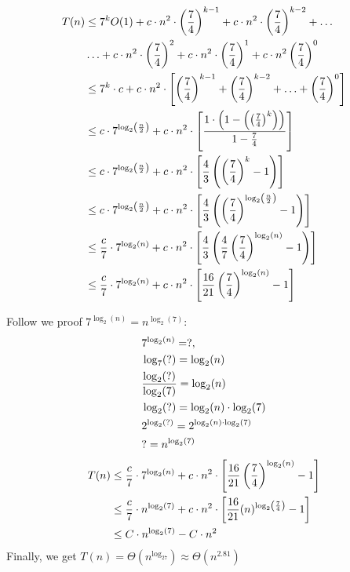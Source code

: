 \documentclass[journal]{IEEEtran}
\begin{document}
\begin{align}
  \notag
  T(n) & \leq 7^{k} O(1)+c \cdot n^{2} \cdot\left(\frac{7}{4}\right)^{k-1}+c \cdot n^{2} \cdot\left(\frac{7}{4}\right)^{k-2}+\ldots\\ \notag
   &\ldots+c \cdot n^{2} \cdot\left(\frac{7}{4}\right)^{2}+c \cdot n^{2} \cdot\left(\frac{7}{4}\right)^{1}+c \cdot n^{2}\left(\frac{7}{4}\right)^{0} \\ \notag
& \leq 7^{k} \cdot c+c \cdot n^{2} \cdot\left[\left(\frac{7}{4}\right)^{k-1}+\left(\frac{7}{4}\right)^{k-2}+\ldots +\left(\frac{7}{4}\right)^{0}\right]\\ \notag
&\leq c \cdot 7^{\log _{2}\left(\frac{n}{2}\right)}+c \cdot n^{2} \cdot\left[\frac{1 \cdot\left(1-\left(\left(\frac{7}{4}\right)^{k}\right)\right)}{1-\frac{7}{4}}\right] \\ \notag
&\leq c \cdot 7^{\log _{2}\left(\frac{n}{2}\right)}+c \cdot n^{2} \cdot\left[\frac{4}{3}\left(\left(\frac{7}{4}\right)^{k}-1\right)\right] \\ \notag
&\leq c \cdot 7^{\log _{2}\left(\frac{n}{2}\right)}+c \cdot n^{2} \cdot\left[\frac{4}{3}\left(\left(\frac{7}{4}\right)^{\log _{2}\left(\frac{n}{2}\right)}-1\right)\right] \\ \notag
&\leq \frac{c}{7} \cdot 7^{\log _{2}(n)}+c \cdot n^{2} \cdot\left[\frac{4}{3}\left(\frac{4}{7}\left(\frac{7}{4}\right)^{\log _{2}(n)}-1\right)\right] \\ \notag
&\leq \frac{c}{7} \cdot 7^{\log _{2}(n)}+c \cdot n^{2} \cdot\left[\frac{16}{21}\left(\frac{7}{4}\right)^{\log _{2}(n)}-1\right]
\end{align}


Follow we proof $7^{\log _{2}(n)}=n^{\log _{2}(7)}:$
\begin{align}
  \notag
 &7^{\log _{2}(n)}=?,\\\notag
 &\log _{7}(?)=\log _{2}(n) \\\notag
&\frac{\log _{2}(?)}{\log _{2}(7)}=\log _{2}(n) \\\notag
&\log _{2}(?)=\log _{2}(n) \cdot \log _{2}(7) \\\notag
&2^{\log _{2}(?)}=2^{\log _{2}(n) \cdot \log _{2}(7)} \\\notag
&?=n^{\log _{2}(7)}
\end{align}
\begin{align}
  \notag
  T(n) & \leq \frac{c}{7} \cdot 7^{\log _{2}(n)}+c \cdot n^{2} \cdot\left[\frac{16}{21}\left(\frac{7}{4}\right)^{\log _{2}(n)}-1\right] \\\notag
& \leq \frac{c}{7} \cdot n^{\log _{2}(7)}+c \cdot n^{2} \cdot\left[\frac{16}{21}(n)^{\log _{2}\left(\frac{7}{4}\right)}-1\right] \\\notag
& \leq C \cdot n^{\log _{2}(7)}-C \cdot n^{2}
\end{align}
Finally, we get $T(n)=\Theta(n^{\mathrm{log}_27})\approx \Theta(n^{2.81})$
\end{document}
